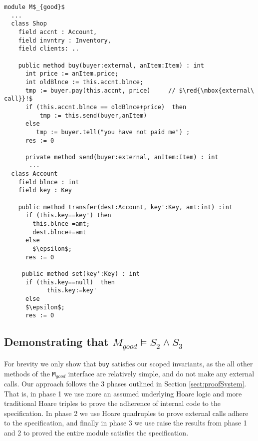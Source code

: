 \begin{lstlisting}[mathescape=true, language=Chainmail, frame=lines]
module M$_{good}$
  ...   
  class Shop
    field accnt : Account, 
    field invntry : Inventory, 
    field clients: ..
  
    public method buy(buyer:external, anItem:Item) : int
      int price := anItem.price;
      int oldBlnce := this.accnt.blnce;
      tmp := buyer.pay(this.accnt, price)     // $\red{\mbox{external\ call}}!$
      if (this.accnt.blnce == oldBlnce+price)  then
          tmp := this.send(buyer,anItem)
      else
         tmp := buyer.tell("you have not paid me") ; 
      res := 0
     
      private method send(buyer:external, anItem:Item) : int
       ... 
  class Account
    field blnce : int 
    field key : Key
    
    public method transfer(dest:Account, key':Key, amt:int) :int
      if (this.key==key') then
        this.blnce-=amt;
        dest.blnce+=amt
      else
        $\epsilon$;
      res := 0
	  
     public method set(key':Key) : int
      if (this.key==null)  then
      		this.key:=key'
      else 
	  $\epsilon$;
      res := 0
\end{lstlisting}

\subsection{Demonstrating that $M_{good} \models S_2 \wedge S_3$}
 \label{s:app:example:proofs}
 
For brevity we only show that \verb|buy| satisfies our scoped invariants, as the all other methods of 
the \verb|M|$_{good}$ interface are relatively simple, and do not make any external calls. 
Our approach follows the 3 phases outlined in Section \ref{sect:proofSystem}. That is, in
phase 1 we use more an assumed underlying Hoare logic and more traditional Hoare triples to prove the adherence of internal code to
the specification. In phase 2 we use Hoare quadruples to prove external calls adhere
to the specification, and finally in phase 3 we use raise the results from phase 1 and 2 to proved
the entire module satisfies the specification.


